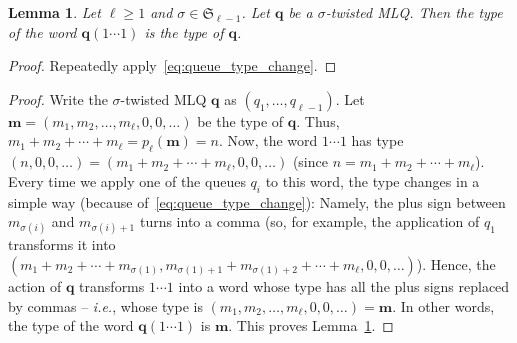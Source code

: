 \documentclass[reqno]{amsart}%
\newcommand{\0}{\phantom{c}}
\newenvironment{verlong}{}{}
\newenvironment{vershort}{}{}
\theoremstyle{plain}
\newtheorem{lemma}[thm]{Lemma}
\theoremstyle{definition}
\numberwithin{equation}{section}
\begin{document}
\begin{lemma}
\label{rmk:mlq-type} Let $\ell\geq1$ and $\sigma\in\mathfrak{S}_{\ell-1}$. Let
$\mathbf{q}$ be a $\sigma$-twisted MLQ. Then the type of the word
$\mathbf{q}(1 \dotsm1)$ is the type of $\mathbf{q}$.
\end{lemma}

\begin{vershort}
\begin{proof}
Repeatedly apply~\eqref{eq:queue_type_change}.
\end{proof}
\end{vershort}

\begin{verlong}
\begin{proof}
Write the $\sigma$-twisted MLQ $\mathbf{q}$ as $\left(  q_{1}, \ldots,
q_{\ell-1} \right)  $. Let $\mathbf{m} = \left(  m_{1}, m_{2}, \ldots,
m_{\ell}, 0, 0, \ldots\right)  $ be the type of $\mathbf{q}$. Thus, $m_{1} +
m_{2} + \cdots+ m_{\ell}= p_{\ell}(\mathbf{m}) = n$. Now, the word $1 \dotsm1$
has type $\left(  n, 0, 0, \ldots\right)  = \left(  m_{1} + m_{2} + \cdots+
m_{\ell}, 0, 0, \ldots\right)  $ (since $n = m_{1} + m_{2} + \cdots+ m_{\ell}%
$). Every time we apply one of the queues $q_{i}$ to this word, the type
changes in a simple way (because of~\eqref{eq:queue_type_change}): Namely, the
plus sign between $m_{\sigma(i)}$ and $m_{\sigma(i)+1}$ turns into a comma
(so, for example, the application of $q_{1}$ transforms it into $\left(  m_{1}
+ m_{2} + \cdots+ m_{\sigma(1)}, m_{\sigma(1)+1} + m_{\sigma(1)+2} + \cdots+
m_{\ell}, 0, 0, \ldots\right)  $). Hence, the action of $\mathbf{q}$
transforms $1 \dotsm1$ into a word whose type has all the plus signs replaced
by commas -- \textit{i.e.}, whose type is $\left(  m_{1}, m_{2}, \ldots,
m_{\ell}, 0, 0, \ldots\right)  = \mathbf{m}$. In other words, the type of the
word $\mathbf{q}(1 \dotsm1)$ is $\mathbf{m}$. This proves
Lemma~\ref{rmk:mlq-type}.


\end{proof}
\end{verlong}
\end{document}

